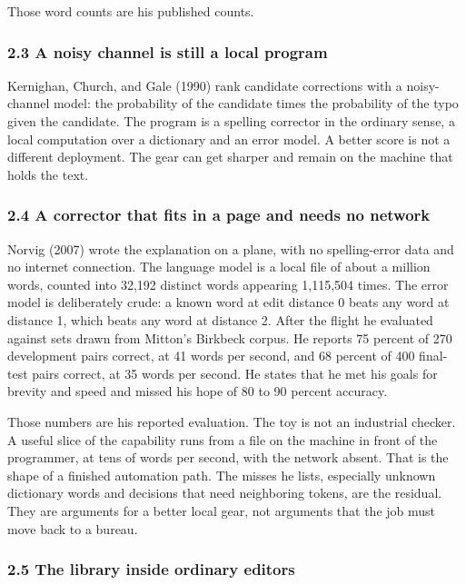\documentclass[
  10pt,
]{article}
\begin{document}
Those word counts are his published counts.

\subsubsection{2.3 A noisy channel is still a local
program}\label{a-noisy-channel-is-still-a-local-program}

Kernighan, Church, and Gale (1990) rank candidate corrections with a
noisy-channel model: the probability of the candidate times the
probability of the typo given the candidate. The program is a spelling
corrector in the ordinary sense, a local computation over a dictionary
and an error model. A better score is not a different deployment. The
gear can get sharper and remain on the machine that holds the text.

\subsubsection{2.4 A corrector that fits in a page and needs no
network}\label{a-corrector-that-fits-in-a-page-and-needs-no-network}

Norvig (2007) wrote the explanation on a plane, with no spelling-error
data and no internet connection. The language model is a local file of
about a million words, counted into 32,192 distinct words appearing
1,115,504 times. The error model is deliberately crude: a known word at
edit distance 0 beats any word at distance 1, which beats any word at
distance 2. After the flight he evaluated against sets drawn from
Mitton's Birkbeck corpus. He reports 75 percent of 270 development pairs
correct, at 41 words per second, and 68 percent of 400 final-test pairs
correct, at 35 words per second. He states that he met his goals for
brevity and speed and missed his hope of 80 to 90 percent accuracy.

Those numbers are his reported evaluation. The toy is not an industrial
checker. A useful slice of the capability runs from a file on the
machine in front of the programmer, at tens of words per second, with
the network absent. That is the shape of a finished automation path. The
misses he lists, especially unknown dictionary words and decisions that
need neighboring tokens, are the residual. They are arguments for a
better local gear, not arguments that the job must move back to a
bureau.

\subsubsection{2.5 The library inside ordinary
editors}\label{the-library-inside-ordinary-editors}
\end{document}
